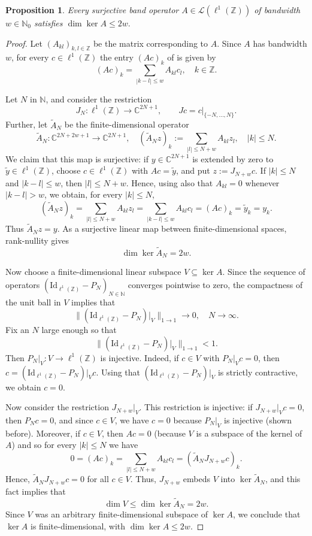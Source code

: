 \documentclass[reqno,a4paper,12pt]{amsart}
\numberwithin{equation}{section}
\newtheorem{proposition}[definition]{Proposition}
\def\N{{\mathbb N}}
\def\Z{{\mathbb Z}}
\newcommand\1{\mathds{1}}
\begin{document}
\begin{proposition}\label{prop:surjective_band_kernel_bound}
    Every surjective band operator $A\in\mathcal L(\ell^1(\Z))$ of
bandwidth $w\in\mathbb N_0$ satisfies
$
\dim\ker A\leq 2w .
$
\end{proposition}
\begin{proof}
Let $(A_{kl})_{k,l \in \Z}$ be the matrix corresponding to $A$. 
Since $A$ has bandwidth $w$, for every   $c \in \ell^1(\Z)$ the entry $(Ac)_k$ of is given by
$$
( Ac)_k=\sum_{|k-l|\leq w}A_{kl}c_l,
\quad k\in\mathbb Z.
$$

Let $N$ in $\N$, and consider the restriction
$$
J_N:\ell^1(\Z)\to\mathbb C^{2N+1},
\qquad
Jc=c|_{\{-N,\dots , N\}}.
$$
Further, let $\tilde A_N$ be the finite-dimensional operator
$$
\tilde A_N:\mathbb C^{2N+2w+1}\to\mathbb C^{2N+1},
\quad
(\tilde A_Nz)_k:=\sum_{|l|\leq N+w}A_{kl}z_l, \quad |k|\leq N.
$$
We claim that this map is surjective: if $y\in\mathbb C^{2N+1}$ is extended by zero to
$\tilde y\in \ell^1(\Z)$, choose $c\in \ell^1(\Z)$ with
$Ac=\tilde y$, and put $z:=J_{N+w}c$. 
If $|k|\leq N$ and
$|k-l|\le w$, then $|l|\leq N+w$. Hence, using also that
$A_{kl}=0$ whenever $|k-l|>w$, we obtain, for every $|k|\leq N$,
$$
(\tilde A_Nz)_k
=
\sum_{|l|\leq N+w}A_{kl}z_l
=
\sum_{|k-l|\le w}A_{kl}c_l
=
(Ac)_k
=
\widetilde y_k
=
y_k.
$$
Thus $\tilde A_Nz=y$.
As a surjective linear map between finite-dimensional spaces, rank-nullity gives
$$
\dim\ker \tilde A_N
=
2w .
$$

Now choose a finite-dimensional linear subspace $V\subseteq\ker A$.
Since the sequence of operators 
$(\mathrm{Id}_{\ell^1(\Z)} - P_N)_{N\in\N}$ converges pointwise to zero, the compactness of the unit ball in $V$ implies that
\begin{equation}\label{eq:QR}
    \| (\mathrm{Id}_{\ell^1(\Z)} - P_N)|_V \|_{1\to1} \to 0, \quad N \to \infty.
\end{equation}
Fix an $N$ large enough so that 
$$
\|(\mathrm{Id}_{\ell^1(\Z)}-P_N)|_V\|_{1\to1}<1.
$$
Then $P_N|_V : V \to \ell^1(\Z) $ is injective. 
Indeed, if $c \in V$ with $P_N|_V c = 0$, then $c = (\mathrm{Id}_{\ell^1(\Z)}-P_N)|_V c$. 
Using that $(\mathrm{Id}_{\ell^1(\Z)}-P_N)|_V$ is strictly contractive, we obtain $c=0$.

Now consider the restriction $J_{N+w}|_V$.
This  restriction is injective: if $J_{N+w}|_Vc=0$, then $P_N c =0$, and since $c \in V$, we have $c=0$ because $P_N|_V$ is injective (shown before). 
Moreover, if  $c\in V$, then $Ac=0$ (because $V$ is a subspace of the kernel of $A$) and so for every $|k|\leq N$ we have
$$
0 = (Ac)_k = \sum_{|l|\leq N+w} A_{kl} c_l = (\tilde A_N J_{N+w} c)_k.
$$
Hence, $\tilde A_N J_{N+w}c=0$ for all $c\in V$. Thus, $J_{N+w}$ embeds $V$
into $\ker \tilde{A}_N$,  and this fact  implies that
$$
\dim V\leq\dim\ker \tilde{A}_N=2w.
$$
Since $V$ was an arbitrary finite-dimensional subspace of $\ker A$,  we conclude that $\ker A$ is finite-dimensional, with $\dim \ker A\leq 2w$.
\end{proof}
\end{document}
